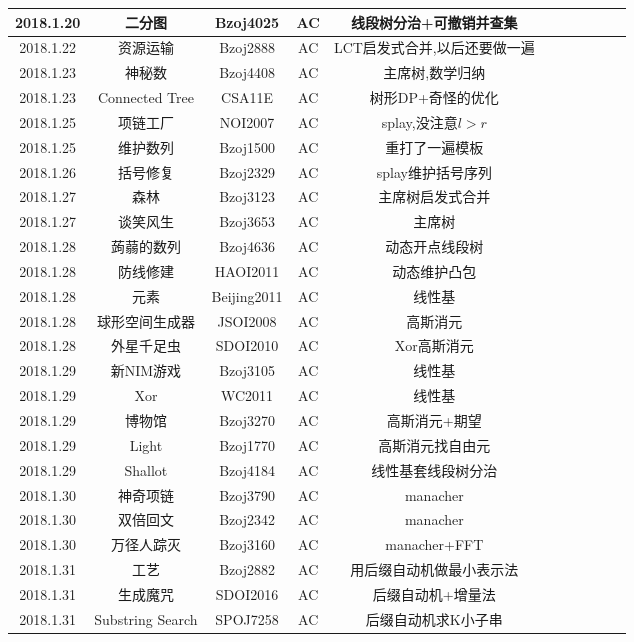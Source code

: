 \documentclass[landscape]{article}
\begin{document}
\begin{longtable}{ccccccccccc}
  \hline
  2018.1.20 & 二分图 & Bzoj4025 & AC & 线段树分治+可撤销并查集\\
  \hline
  2018.1.22 & 资源运输 & Bzoj2888 & AC & LCT启发式合并,以后还要做一遍\\
  \hline
  2018.1.23 & 神秘数 & Bzoj4408 & AC & 主席树,数学归纳\\
  \hline
  2018.1.23 & Connected Tree & CSA11E & AC & 树形DP+奇怪的优化\\
  \hline
  2018.1.25 & 项链工厂 & NOI2007 & AC & splay,没注意$l>r$\\
  \hline
  2018.1.25 & 维护数列 & Bzoj1500 & AC & 重打了一遍模板\\
  \hline
  2018.1.26 & 括号修复 & Bzoj2329 & AC & splay维护括号序列\\
  \hline
  2018.1.27 & 森林 & Bzoj3123 & AC & 主席树启发式合并\\
  \hline
  2018.1.27 & 谈笑风生 & Bzoj3653 & AC & 主席树\\
  \hline
  2018.1.28 & 蒟蒻的数列 & Bzoj4636 & AC & 动态开点线段树\\
  \hline
  2018.1.28 & 防线修建 & HAOI2011 & AC & 动态维护凸包\\
  \hline
  2018.1.28 & 元素 & Beijing2011 & AC & 线性基\\
  \hline
  2018.1.28 & 球形空间生成器 & JSOI2008 & AC & 高斯消元\\
  \hline
  2018.1.28 & 外星千足虫 & SDOI2010 & AC & Xor高斯消元\\
  \hline
  2018.1.29 & 新NIM游戏 & Bzoj3105 & AC & 线性基\\
  \hline
  2018.1.29 & Xor & WC2011 & AC & 线性基\\
  \hline
  2018.1.29 & 博物馆 & Bzoj3270 & AC & 高斯消元+期望\\
  \hline
  2018.1.29 & Light & Bzoj1770 & AC & 高斯消元找自由元\\
  \hline
  2018.1.29 & Shallot & Bzoj4184 & AC & 线性基套线段树分治\\
  \hline
  2018.1.30 & 神奇项链 & Bzoj3790 & AC & manacher\\
  \hline
  2018.1.30 & 双倍回文 & Bzoj2342 & AC & manacher\\
  \hline
  2018.1.30 & 万径人踪灭 & Bzoj3160 & AC & manacher+FFT\\
  \hline
  2018.1.31 & 工艺 & Bzoj2882 & AC & 用后缀自动机做最小表示法\\
  \hline
  2018.1.31 & 生成魔咒 & SDOI2016 & AC & 后缀自动机+增量法\\
  \hline
  2018.1.31 & Substring Search & SPOJ7258 & AC & 后缀自动机求K小子串\\

\end{longtable}
\end{document}
